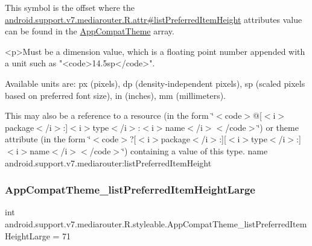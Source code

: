 This symbol is the offset where the \hyperlink{classandroid_1_1support_1_1v7_1_1mediarouter_1_1R_1_1attr_aa9a404fba2eca8bca49c55849a05e777}{android.\+support.\+v7.\+mediarouter.\+R.\+attr\#list\+Preferred\+Item\+Height} attribute\textquotesingle{}s value can be found in the \hyperlink{classandroid_1_1support_1_1v7_1_1mediarouter_1_1R_1_1styleable_a4e3d3900c75d49aeb2f283cac00214d6}{App\+Compat\+Theme} array.

\begin{DoxyVerb}      <p>Must be a dimension value, which is a floating point number appended with a unit such as "<code>14.5sp</code>".
\end{DoxyVerb}
 Available units are\+: px (pixels), dp (density-\/independent pixels), sp (scaled pixels based on preferred font size), in (inches), mm (millimeters). 

This may also be a reference to a resource (in the form \char`\"{}$<$code$>$@\mbox{[}$<$i$>$package$<$/i$>$\+:\mbox{]}$<$i$>$type$<$/i$>$\+:$<$i$>$name$<$/i$>$$<$/code$>$\char`\"{}) or theme attribute (in the form \char`\"{}$<$code$>$?\mbox{[}$<$i$>$package$<$/i$>$\+:\mbox{]}\mbox{[}$<$i$>$type$<$/i$>$\+:\mbox{]}$<$i$>$name$<$/i$>$$<$/code$>$\char`\"{}) containing a value of this type.  name android.\+support.\+v7.\+mediarouter\+:list\+Preferred\+Item\+Height \mbox{\label{classandroid_1_1support_1_1v7_1_1mediarouter_1_1R_1_1styleable_ab27c1a75e8d929dff26ffcc92b6ae2e9}} 
\subsubsection{\texorpdfstring{App\+Compat\+Theme\+\_\+list\+Preferred\+Item\+Height\+Large}{AppCompatTheme\_listPreferredItemHeightLarge}}
{\footnotesize\ttfamily int android.\+support.\+v7.\+mediarouter.\+R.\+styleable.\+App\+Compat\+Theme\+\_\+list\+Preferred\+Item\+Height\+Large = 71\hspace{0.3cm}{\ttfamily [static]}}

